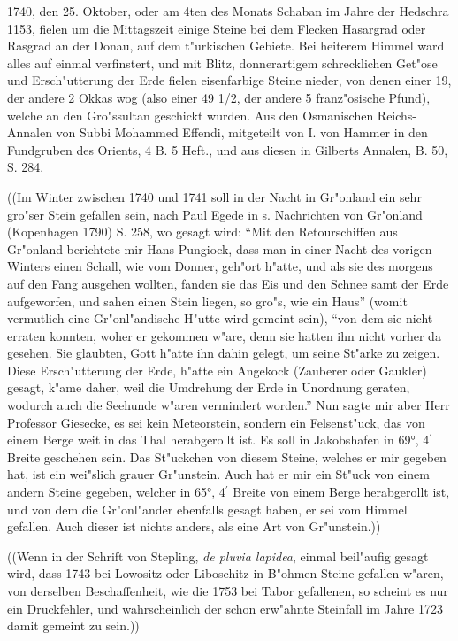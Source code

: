 \documentclass[a4paper, 11pt, oneside, polutonikogreek, german]{article}
\begin{document}
1740, den 25. Oktober, oder am 4ten des Monats Schaban im Jahre der Hedschra 1153, fielen um die Mittagszeit einige Steine bei dem Flecken Hasargrad oder Rasgrad an der Donau, auf dem t"urkischen Gebiete. Bei heiterem Himmel ward alles auf einmal verfinstert, und mit Blitz, donnerartigem schrecklichen Get"ose und Ersch"utterung der Erde fielen eisenfarbige Steine nieder, von denen einer 19, der andere 2 Okkas wog (also einer 49 1/2, der andere 5 franz"osische Pfund), welche an den Gro"ssultan geschickt wurden. Aus den Osmanischen Reichs-Annalen von Subbi Mohammed Effendi, mitgeteilt von I. von Hammer in den Fundgruben des Orients, 4 B. 5 Heft., und aus diesen in Gilberts Annalen, B. 50, S. 284.

((Im Winter zwischen 1740 und 1741 soll in der Nacht in Gr"onland ein sehr gro"ser Stein gefallen sein, nach Paul Egede in s. Nachrichten von Gr"onland (Kopenhagen 1790) S. 258, wo gesagt wird: "`Mit den Retourschiffen aus Gr"onland berichtete mir Hans Pungiock, dass man in einer Nacht des vorigen Winters einen Schall, wie vom Donner, geh"ort h"atte, und als sie des morgens auf den Fang ausgehen wollten, fanden sie das Eis und den Schnee samt der Erde aufgeworfen, und sahen einen Stein liegen, so gro"s, wie ein Haus"' (womit vermutlich eine Gr"onl"andische H"utte wird gemeint sein), "`von dem sie nicht erraten konnten, woher er gekommen w"are, denn sie hatten ihn nicht vorher da gesehen. Sie glaubten, Gott h"atte ihn dahin gelegt, um seine St"arke zu zeigen. Diese Ersch"utterung der Erde, h"atte ein Angekock (Zauberer oder Gaukler) gesagt, k"ame daher, weil die Umdrehung der Erde in Unordnung geraten, wodurch auch die Seehunde w"aren vermindert worden."' Nun sagte mir aber Herr Professor Giesecke, es sei kein Meteorstein, sondern ein Felsenst"uck, das von einem Berge weit in das Thal herabgerollt ist. Es soll in Jakobshafen in 69°, 4$^{\prime}$ Breite geschehen sein. Das St"uckchen von diesem Steine, welches er mir gegeben hat, ist ein wei"slich grauer Gr"unstein. Auch hat er mir ein St"uck von einem andern Steine gegeben, welcher in 65°, 4$^{\prime}$ Breite von einem Berge herabgerollt ist, und von dem die Gr"onl"ander ebenfalls gesagt haben, er sei vom Himmel gefallen. Auch dieser ist nichts anders, als eine Art von Gr"unstein.))

((Wenn in der Schrift von Stepling, \emph{de pluvia lapidea}, einmal beil"aufig gesagt wird, dass 1743 bei Lowositz oder Liboschitz in B"ohmen Steine gefallen w"aren, von derselben Beschaffenheit, wie die 1753 bei Tabor gefallenen, so scheint es nur ein Druckfehler, und wahrscheinlich der schon erw"ahnte Steinfall im Jahre 1723 damit gemeint zu sein.))
\end{document}
